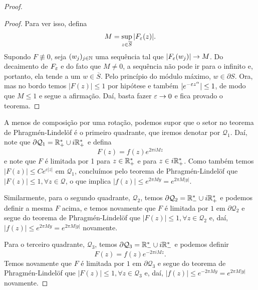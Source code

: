 \begin{proof}
\begin{proof}
                Para ver isso, defina
                \begin{equation*}
                    M = \sup_{z\in\overline{S}} |F_{\varepsilon}(z)|.
                \end{equation*}
                Supondo $F\not\equiv 0$, seja $(w_j)_{j\in\mathbb{N}}$ uma sequência tal 
                que $|F_{\varepsilon}(w_j)|\to M$. Do decaimento de $F_{\varepsilon}$ e 
                do fato que $M\neq 0$, a sequência não pode ir para o
                infinito e, portanto, ela tende a um $w\in\overline{S}$.
                Pelo princípio do módulo máximo, $w\in\partial S$. Ora, 
                mas no bordo temos $|F(z)| \leq 1$
                por hipótese e também $|e^{-\varepsilon z^{\alpha}}| \leq 1$, de
                modo que $M\leq 1$ e segue a afirmação. Daí, basta fazer
                $\varepsilon\to 0$ e fica provado o teorema.
            \end{proof}
            
            A menos de composição por uma rotação, podemos supor que
            o setor no teorema de Phragmén-Lindelöf é o primeiro quadrante,
            que iremos denotar por $\mathcal{Q}_1$. Daí, note que 
            $\partial\mathcal{Q}_1 = \mathbb{R}_+^* \cup i\mathbb{R}_+^*$ e defina
            \begin{equation*}
                F(z) = f(z)e^{2\pi i Mz}
            \end{equation*}
            e note que $F$ é limitada por 1 para $z\in\mathbb{R}_+^*$ e para
            $z\in i\mathbb{R}_+^*$. Como também temos $|F(z)| \leq Ce^{c|z|}$
            em $\mathcal{Q}_1$, concluímos pelo teorema de Phragmén-Lindelöf
            que $|F(z)| \leq 1, \forall z\in\mathcal{Q}$, o que implica
            $|f(z)| \leq e^{2\pi M y} = e^{2\pi M|y|}$.
            
            Similarmente, para o segundo quadrante, $\mathcal{Q}_2$,
            temos $\partial\mathcal{Q}_2 = \mathbb{R}_-^* \cup i\mathbb{R}_+^*$ e 
            podemos definir a mesma $F$ acima, e temos novamente que 
            $F$ é limitada por $1$ em
            $\partial\mathcal{Q}_2$ e segue do teorema de Phragmén-Lindelöf 
            que $|F(z)| \leq 1, \forall z\in\mathcal{Q}_2$ e, daí,
            $|f(z)| \leq e^{2\pi My} = e^{2\pi M|y|}$ novamente.
            
            Para o terceiro quadrante, $\mathcal{Q}_3$,
            temos $\partial\mathcal{Q}_3 = \mathbb{R}_-^* \cup i\mathbb{R}_-^*$ e 
            podemos definir 
            \begin{equation*}
                F(z) = f(z)e^{-2\pi i Mz}.
            \end{equation*}
            Temos novamente que $F$ é limitada por $1$ em
            $\partial\mathcal{Q}_3$ e segue do teorema de Phragmén-Lindelöf 
            que $|F(z)| \leq 1, \forall z\in\mathcal{Q}_3$ e, daí,
            $|f(z)| \leq e^{-2\pi My} = e^{2\pi M|y|}$ novamente.
            

\end{proof}
